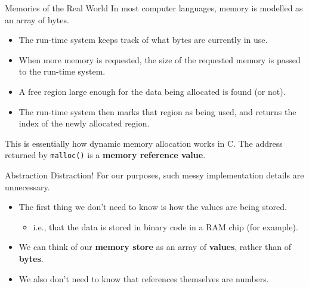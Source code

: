 \documentclass[11pt]{beamer}
\begin{document}
\begin{frame}[fragile=singleslide]{Memories of the Real World}
In most computer languages, memory is modelled as an array of bytes. 
\begin{itemize}
\item The run-time system keeps track of what bytes are currently in use.
\item When more memory is requested, the size of the requested memory is passed to the run-time system.
\item A free region large enough for the data being allocated is found (or not). 
\item The run-time system then marks that region as being used, and returns the index of the newly allocated region.  
\end{itemize}
This is essentially how dynamic memory allocation works in C.  The address returned by \texttt{malloc()} is a \textbf{memory reference value}.
\end{frame}


\begin{frame}[fragile=singleslide]{Abstraction Distraction!}
For our purposes, such messy implementation details are unnecessary.  
\begin{itemize}
\item The first thing we don't need to know is how the values are being stored. 
\begin{itemize}
\item i.e., that the data is stored in binary code in a RAM chip (for example).
\end{itemize}
\item We can think of our \textbf{memory store} as an array of \textbf{values}, rather than of \textbf{bytes}.
\item We also don't need to know that references themselves are numbers.  
\end{itemize}
\end{frame}
\end{document}
